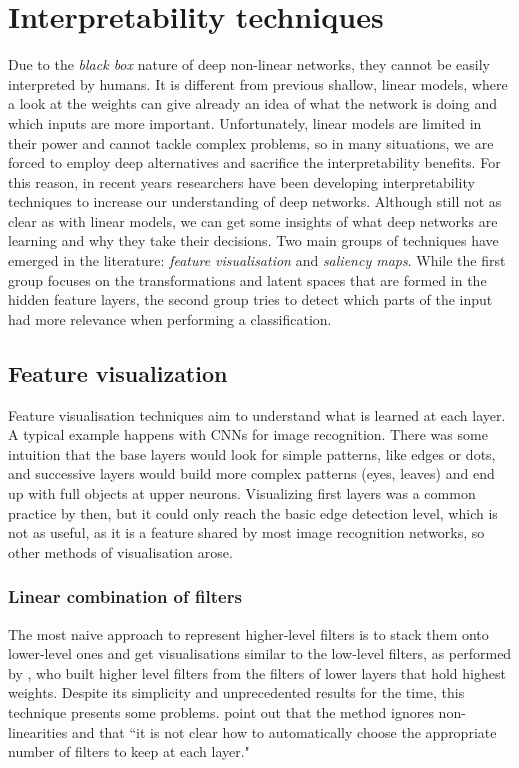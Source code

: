 

\section{Interpretability techniques}

Due to the \textit{black box} nature of deep non-linear networks, they cannot be easily interpreted by humans. It is different from previous shallow, linear models, where a look at the weights can give already an idea of what the network is doing and which inputs are more important. Unfortunately, linear models are limited in their power and cannot tackle complex problems, so in many situations, we are forced to employ deep alternatives and sacrifice the interpretability benefits. For this reason, in recent years researchers have been developing interpretability techniques to increase our understanding of deep networks. Although still not as clear as with linear models, we can get some insights of what deep networks are learning and why they take their decisions. Two main groups of techniques have emerged in the literature: \textit{feature visualisation} and \textit{saliency maps}. While the first group focuses on the transformations and latent spaces that are formed in the hidden feature layers, the second group tries to detect which parts of the input had more relevance when performing a classification.

\subsection{Feature visualization}\label{sect:featvis}

Feature visualisation techniques aim to understand what is learned at each layer. A typical example happens with CNNs for image recognition. There was some intuition that the base layers would look for simple patterns, like edges or dots, and successive layers would build more complex patterns (eyes, leaves) and end up with full objects at upper neurons. Visualizing first layers was a common practice by then, but it could only reach the basic edge detection level, which is not as useful, as it is a feature shared by most image recognition networks, so other methods of visualisation arose.

\subsubsection*{Linear combination of filters}
The most naive approach to represent higher-level filters is to stack them onto lower-level ones and get visualisations similar to the low-level filters, as performed by \cite{Lee2009}, who built higher level filters from the filters of lower layers that hold highest weights. Despite its simplicity and unprecedented results for the time, this technique presents some problems. \cite{Erhan2009} point out that the method ignores non-linearities and that ``it is not clear how to automatically choose the appropriate number of filters to keep at each layer."


